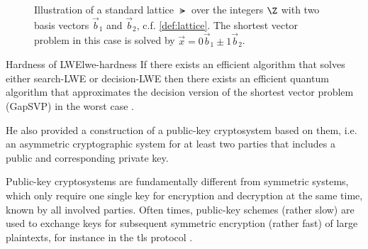 \usetikzlibrary{calc}
\begin{figure}
  \centering
  \caption{Illustration of a standard lattice $\lat$ over the integers $\Z$
    with two basis vectors $\vec{b}_1$ and $\vec{b}_2$, c.f. \autoref{def:lattice}.
    The shortest vector problem in this case is solved by $\vec{x} = 0 \vec{b}_1 \pm 1 \vec{b}_2$.}
  \label{fig:lattice}
\end{figure}

\begin{theorem}{Hardness of LWE}{lwe-hardness}
  If there exists an efficient algorithm that solves either search-LWE or decision-LWE then
  there exists an efficient quantum algorithm that approximates the decision
  version of the shortest vector problem (GapSVP) in the worst case \parencite{2010-lwe-survey}.
\end{theorem}

He also provided a construction of a public-key cryptosystem based on them, i.e. an asymmetric cryptographic
system for at least two parties that includes a public and corresponding private key.

Public-key cryptosystems are fundamentally different from symmetric systems, which only
require one single key for encryption and decryption at the same time, known by all involved parties.
Often times, public-key schemes (rather slow) are used to exchange keys for subsequent symmetric encryption
(rather fast) of large plaintexts, for instance in the \gls{tls} protocol \parencite{rfc8446}.

